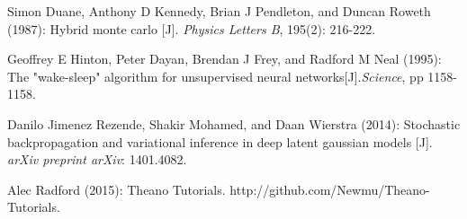 \documentclass[11pt]{article}
\begin{document}
\noindent
[3]  Simon Duane, Anthony D Kennedy, Brian J Pendleton, and Duncan Roweth (1987): Hybrid monte carlo [J]. \textit{Physics Letters B}, 195(2): 216-222.
\newline

\noindent
[4] Geoffrey E Hinton, Peter Dayan, Brendan J Frey, and Radford M Neal (1995): The "wake-sleep" algorithm for unsupervised neural networks[J].\textit{Science}, pp 1158-1158.
\newline

\noindent
[5] Danilo Jimenez Rezende, Shakir Mohamed, and Daan Wierstra (2014): Stochastic backpropagation and variational inference in deep latent gaussian models [J]. \textit{arXiv preprint arXiv}: 1401.4082.
\newline

\noindent
[6] Alec Radford (2015): Theano Tutorials. http://github.com/Newmu/Theano-Tutorials.
\end{document}
